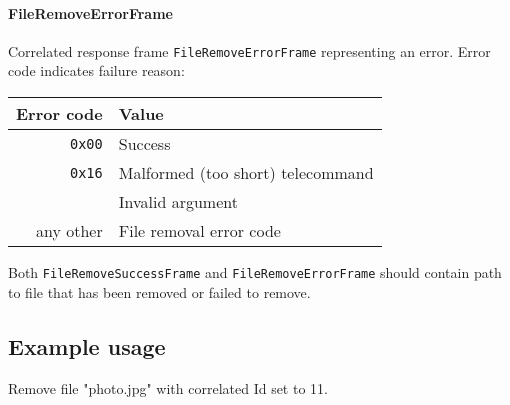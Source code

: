 \paragraph{FileRemoveErrorFrame}
Correlated response frame \texttt{FileRemoveErrorFrame} representing an error. Error code indicates failure reason:

\begin{tabular}{r | l}
    Error code & Value \\
    \hline
    \texttt{0x00}   & Success \\
    \texttt{0x16}   & Malformed (too short) telecommand \\
                    & Invalid argument \\
    any other & File removal error code \\
\end{tabular}

Both \texttt{FileRemoveSuccessFrame} and \texttt{FileRemoveErrorFrame} should contain path to file that 
has been removed or failed to remove.


\subsection{Example usage}
Remove file "photo.jpg" with correlated Id set to 11.

